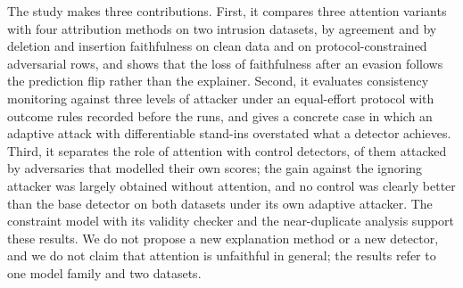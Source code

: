 The study makes three contributions.
First, it compares three attention variants with four attribution methods on two intrusion datasets, by agreement and
by deletion and insertion faithfulness on clean data and on protocol-constrained adversarial rows, and shows that the
loss of faithfulness after an evasion follows the prediction flip rather than the explainer.
Second, it evaluates consistency monitoring against three levels of attacker under an equal-effort protocol with outcome
rules recorded before the runs, and gives a concrete case in which an adaptive attack with differentiable stand-ins
overstated what a detector achieves.
Third, it separates the role of attention with control detectors, \nControlsAttacked{} of them attacked by adversaries
that modelled their own scores; the gain against the ignoring attacker was largely obtained without attention, and no
control was clearly better than the base detector on both datasets under its own adaptive attacker.
The constraint model with its validity checker and the near-duplicate analysis support these results.
We do not propose a new explanation method or a new detector, and we do not claim that attention is unfaithful in
general; the results refer to one model family and two datasets.
